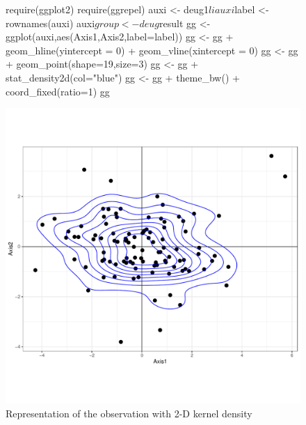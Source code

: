 \documentclass[a4paper,10pt]{article}
\begin{document}
\begin{figure}[H]
\begin{center}
\begin{Schunk}
\begin{Sinput}
  require(ggplot2)
  require(ggrepel)
  auxi <- deug1$li
  auxi$label <- rownames(auxi)
  auxi$group <- deug$result
  gg <- ggplot(auxi,aes(Axis1,Axis2,label=label))
  gg <- gg + geom_hline(yintercept = 0) + geom_vline(xintercept = 0)
  gg <- gg + geom_point(shape=19,size=3)
  gg <- gg + stat_density2d(col="blue")
  gg <-  gg + theme_bw() + coord_fixed(ratio=1)
  gg
\end{Sinput}
\end{Schunk}
\includegraphics{figs/sweave-lidensity1}
\caption{Representation of the observation with 2-D kernel density}
\label{fig:lidensity1}
\end{center}
\end{figure}
\end{document}
